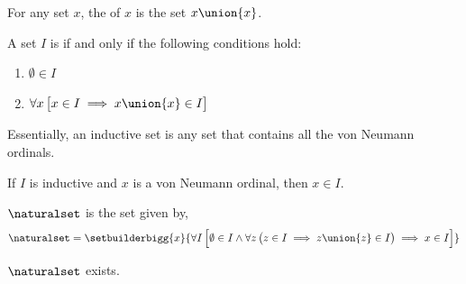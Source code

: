 \begin{dfn}[Successor]
    \label{dfn:successor}
    For any set \( x \), the  of \( x \) is the set \( x \union \mleft\{ x \mright\} \).
\end{dfn}

\begin{dfn}
    \label{dfn:inductive-set}
    A set \( I \) is  if and only if the following conditions hold:
    \begin{enumerate}[topsep=2pt,noitemsep,label=\texttt{\textup{(\alph*)}}]
        \item \( \emptyset \in I \)
        \item \( \forall x \, \big[ x \in I \implies x \union \mleft\{ x \mright\} \in I \big] \)
    \end{enumerate}
\end{dfn}

\begin{rem}
    Essentially, an inductive set is any set that contains all the von Neumann ordinals.
\end{rem}

\begin{cor}
    \label{thm:any-von-neumann-ordinal-belongs-to-an-inductive-set}
    If \( I \) is inductive and \( x \) is a von Neumann ordinal, then \( x \in I \).
\end{cor}

\begin{dfn}
    \label{dfn:the-set-of-natural-numbers}
    \( \naturalset \) is the set given by,
    \begin{equation*}
        \naturalset = \setbuilderbigg{x}{\forall I \, \Big[ \emptyset \in I \land \forall z \, \big( z \in I \implies z \union \mleft\{ z \mright\} \in I \big) \implies x \in I \Big]}
    \end{equation*}
\end{dfn}

\begin{thm}
    \label{thm:existence-of-the-set-of-all-natural-numbers}
    \( \naturalset \) exists.
\end{thm}

